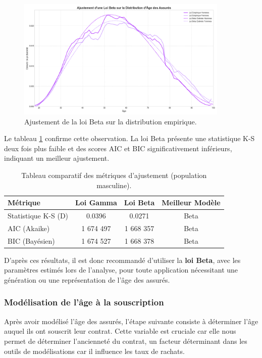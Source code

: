 \begin{figure}[H]
\centering
\includegraphics[width=0.9\textwidth]{images/2_chapitres/chapitre3/estimation_loi_beta.png}
\caption{Ajustement de la loi Beta sur la distribution empirique.}
\label{fig:beta}
\end{figure}

Le tableau \ref{tab:stats} confirme cette observation. La loi Beta présente une statistique K-S deux fois plus faible et des scores AIC et BIC significativement inférieurs, indiquant un meilleur ajustement.

\begin{table}[H]
\centering
\begin{tabular}{@{}lccc@{}}
\toprule
\textbf{Métrique} & \textbf{Loi Gamma} & \textbf{Loi Beta} & \textbf{Meilleur Modèle} \\
\midrule
Statistique K-S (D) & 0.0396 & 0.0271 & Beta \\
AIC (Akaike) & 1 674 497 & 1 668 357 & Beta \\
BIC (Bayésien) & 1 674 527 & 1 668 378 & Beta \\
\bottomrule
\end{tabular}
\caption{Tableau comparatif des métriques d'ajustement (population masculine).}
\label{tab:stats}
\end{table}

D'après ces résultats, il est donc recommandé d'utiliser la \textbf{loi Beta}, avec les paramètres estimés lors de l'analyse, pour toute application nécessitant une génération ou une représentation de l'âge des assurés.


\subsubsection{Modélisation de l'âge à la souscription}

Après avoir modélisé l'âge des assurés, l'étape suivante consiste à déterminer l'âge auquel ils ont souscrit leur contrat. Cette variable est cruciale car elle nous permet de déterminer l'ancienneté du contrat, un facteur déterminant dans les outils de modélisations car il influence les taux de rachats.

